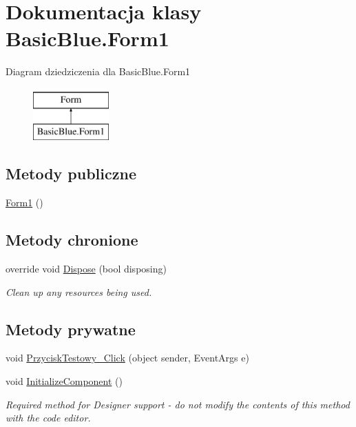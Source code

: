 \hypertarget{class_basic_blue_1_1_form1}{\section{Dokumentacja klasy Basic\-Blue.\-Form1}
\label{class_basic_blue_1_1_form1}
}
Diagram dziedziczenia dla Basic\-Blue.\-Form1\begin{figure}[H]
\begin{center}
\leavevmode
\includegraphics[height=2.000000cm]{class_basic_blue_1_1_form1}
\end{center}
\end{figure}
\subsection*{Metody publiczne}
\begin{DoxyCompactItemize}
\item 
\hyperlink{class_basic_blue_1_1_form1_adf813916558dff6afd7510c7cc102597}{Form1} ()
\end{DoxyCompactItemize}
\subsection*{Metody chronione}
\begin{DoxyCompactItemize}
\item 
override void \hyperlink{class_basic_blue_1_1_form1_a6dcb10ee9b42694b23e19c76753de3a4}{Dispose} (bool disposing)
\begin{DoxyCompactList}\small\item\em Clean up any resources being used. \end{DoxyCompactList}\end{DoxyCompactItemize}
\subsection*{Metody prywatne}
\begin{DoxyCompactItemize}
\item 
void \hyperlink{class_basic_blue_1_1_form1_a02f084a319ad1cd48666960bb6f50777}{Przycisk\-Testowy\-\_\-\-Click} (object sender, Event\-Args e)
\item 
void \hyperlink{class_basic_blue_1_1_form1_affb3aff21b09e5a73a86abedfded654b}{Initialize\-Component} ()
\begin{DoxyCompactList}\small\item\em Required method for Designer support -\/ do not modify the contents of this method with the code editor. \end{DoxyCompactList}\end{DoxyCompactItemize}
